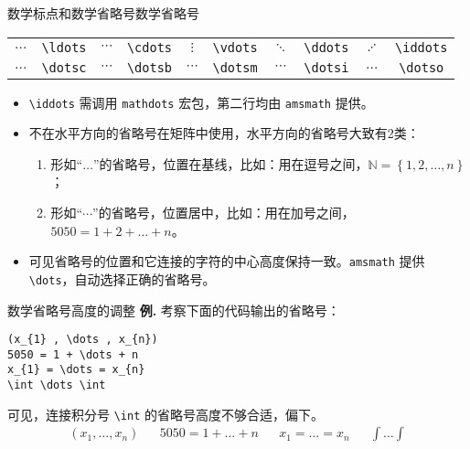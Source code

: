 \documentclass[mathserif]{beamer}
\newcommand{\codegreen}[1]{\textcolor{codegreen}{#1}}
\newcommand{\natura}{\mathbb N}
\newenvironment{instance}{\zihao{-5}\textbf{\songti \codegreen{例.}}}{\hfill\par}
\begin{document}
\begin{frame}[fragile]{数学标点和数学省略号}{数学省略号}
\begin{table}[H]
\centering
\begin{tabular}{cc|cc|cc|cc|cc}
	\toprule
	$\ldots$ & \lstinline'\ldots' & $\cdots$ & \lstinline'\cdots' & $\vdots$ & \lstinline'\vdots' & $\ddots$ & \lstinline'\ddots' & $\iddots$ & \lstinline'\iddots' \\
	$\dotsc$ & \lstinline'\dotsc' & $\dotsb$ & \lstinline'\dotsb' & $\dotsm$ & \lstinline'\dotsm' & $\dotsi$ & \lstinline'\dotsi' & $\dotso$ & \lstinline'\dotso' \\
	\bottomrule
\end{tabular}
\end{table}
\begin{itemize}

\item \lstinline'\iddots' 需调用 \verb'mathdots' 宏包，第二行均由 \verb'amsmath' 提供。

\item 不在水平方向的省略号在矩阵中使用，水平方向的省略号大致有2类：
\begin{enumerate}[(1)]

\item 形如``$\ldots$''的省略号，位置在基线，比如：用在逗号之间，$\natura = \left\{ 1, 2, \ldots, n \right\}$；

\item 形如``$\cdots$''的省略号，位置居中，比如：用在加号之间，$5050 = 1 + 2 +\dots+ n$。

\end{enumerate}

\item 可见省略号的位置和它连接的字符的中心高度保持一致。\verb'amsmath' 提供 \lstinline'\dots'，自动选择正确的省略号。

\end{itemize}
\end{frame}

\begin{frame}[fragile]{数学省略号}{高度的调整}
\begin{instance}
	考察下面的代码输出的省略号：
\begin{lstlisting}[numbers=none]
(x_{1} , \dots , x_{n})
5050 = 1 + \dots + n
x_{1} = \dots = x_{n}
\int \dots \int
\end{lstlisting}
可见，连接积分号 \lstinline'\int' 的省略号高度不够合适，偏下。
\begin{align*}
	(x_{1} , \dots , x_{n}) &&
	5050 = 1 + \dots + n &&
	x_{1} = \dots = x_{n} &&
	\int \dots \int
\end{align*}
\end{instance}
\end{frame}
\end{document}
